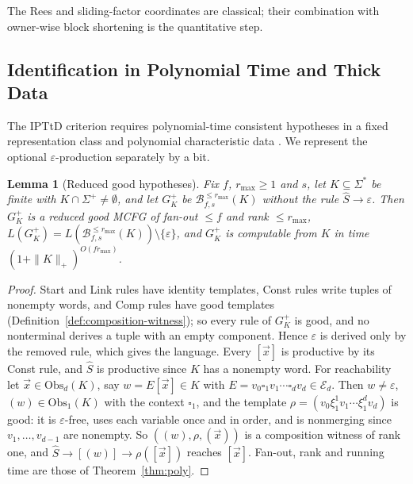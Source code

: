 \documentclass[11pt]{article}
\numberwithin{equation}{section}
\theoremstyle{plain}
\newtheorem{lemma}[theorem]{Lemma}
\theoremstyle{definition}
\theoremstyle{remark}
\newcommand{\tuple}[1]{\vec{#1}}
\newcommand{\blank}{\square}
\newcommand{\eps}{\varepsilon}
\theoremstyle{plain}
\begin{document}
The Rees and sliding-factor coordinates are classical; their combination with
owner-wise block shortening is the quantitative step.


\subsection{Identification in Polynomial Time and Thick Data}
The IPTtD criterion requires polynomial-time consistent hypotheses in
a fixed representation class and polynomial characteristic data
\cite[Definition~2.12]{EyraudHeinzYoshinaka2016}.
We represent the optional $\eps$-production separately by a bit.

\begin{lemma}[Reduced good hypotheses]
\label{lem:reduced-good-hypothesis}
Fix $f$, $r_{\max}\ge1$ and $s$, let $K\subseteq\Sigma^*$ be finite with
$K\cap\Sigma^+\ne\emptyset$, and let $G^+_K$ be
$\mathcal B^{\le r_{\max}}_{f,s}(K)$ without the rule $\widehat S\to\eps$.  Then
$G^+_K$ is a reduced good MCFG of fan-out $\le f$ and rank $\le r_{\max}$,
$L(G^+_K)=L(\mathcal B^{\le r_{\max}}_{f,s}(K))\setminus\{\eps\}$, and $G^+_K$ is
computable from $K$ in time $(1+\|K\|_+)^{O(fr_{\max})}$.
\end{lemma}

\begin{proof}
Start and Link rules have identity templates, Const rules write tuples of
nonempty words, and Comp rules have good templates
(Definition~\ref{def:composition-witness}); so every rule of $G^+_K$ is good, and
no nonterminal derives a tuple with an empty component.  Hence $\eps$ is derived
only by the removed rule, which gives the language.  Every $[\tuple x]$ is
productive by its Const rule, and $\widehat S$ is productive since $K$ has a
nonempty word.  For reachability let $\tuple x\in\mathrm{Obs}_d(K)$, say
$w=E[\tuple x]\in K$ with $E=v_0\blank_1v_1\cdots\blank_dv_d\in\mathcal E_d$.  Then $w\ne\eps$,
$(w)\in\mathrm{Obs}_1(K)$ with the context $\blank_1$, and the template
$\rho=(v_0\xi_1^1v_1\cdots\xi_1^dv_d)$ is good: it is $\eps$-free, uses each
variable once and in order, and is nonmerging since $v_1,\ldots,v_{d-1}$ are
nonempty.  So $((w),\rho,(\tuple x))$ is a composition witness of rank one, and
$\widehat S\to[(w)]\to\rho([\tuple x])$ reaches $[\tuple x]$.  Fan-out, rank and
running time are those of Theorem~\ref{thm:poly}.
\end{proof}
\end{document}
